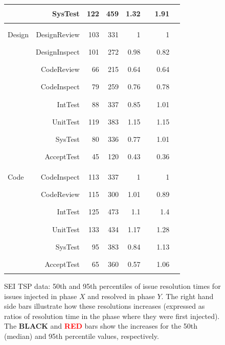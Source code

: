 \documentclass[smallcondesed]{svjour3}
\begin{document}
\begin{figure}
\begin{center}
\begin{tabular}{l@{~~~}r|r@{~}r|r@{~}lr@{~}l}
&SysTest&122&459&1.32&\rule{13mm}{2mm}&1.91&\textcolor{red}{\rule{19mm}{2mm}} \\\hline\\
Design&DesignReview&103&331&1&\rule{10mm}{2mm}&1&\textcolor{red}{\rule{10mm}{2mm}} \\
&DesignInspect&101&272&0.98&\rule{10mm}{2mm}&0.82&\textcolor{red}{\rule{8mm}{2mm}} \\
&CodeReview&66&215&0.64&\rule{6mm}{2mm}&0.64&\textcolor{red}{\rule{6mm}{2mm}} \\
&CodeInspect&79&259&0.76&\rule{8mm}{2mm}&0.78&\textcolor{red}{\rule{8mm}{2mm}} \\
&IntTest&88&337&0.85&\rule{9mm}{2mm}&1.01&\textcolor{red}{\rule{10mm}{2mm}} \\
&UnitTest&119&383&1.15&\rule{12mm}{2mm}&1.15&\textcolor{red}{\rule{12mm}{2mm}} \\
&SysTest&80&336&0.77&\rule{8mm}{2mm}&1.01&\textcolor{red}{\rule{10mm}{2mm}} \\
&AcceptTest&45&120&0.43&\rule{4mm}{2mm}&0.36&\textcolor{red}{\rule{4mm}{2mm}} \\\hline\\
Code&CodeInspect&113&337&1&\rule{10mm}{2mm}&1&\textcolor{red}{\rule{10mm}{2mm}} \\
&CodeReview&115&300&1.01&\rule{10mm}{2mm}&0.89&\textcolor{red}{\rule{9mm}{2mm}} \\
&IntTest&125&473&1.1&\rule{11mm}{2mm}&1.4&\textcolor{red}{\rule{14mm}{2mm}} \\
&UnitTest&133&434&1.17&\rule{12mm}{2mm}&1.28&\textcolor{red}{\rule{13mm}{2mm}} \\
&SysTest&95&383&0.84&\rule{8mm}{2mm}&1.13&\textcolor{red}{\rule{11mm}{2mm}} \\
&AcceptTest&65&360&0.57&\rule{6mm}{2mm}&1.06&\textcolor{red}{\rule{11mm}{2mm}} \\

\end{tabular}

\end{center}
\caption{ SEI TSP data: 50th and 95th percentiles of issue resolution times for issues injected in phase $X$ and resolved in phase $Y$.
The right hand side bars
illustrate how these resolutions increases (expressed as ratios of resolution time in the phase where they were first injected).
The {\bf BLACK} and \textcolor{red}{{\bf RED}} bars show the increases for the  50th (median) and 95th percentile values, respectively.
}
\label{fig:raw}
\end{figure}
\end{document}
